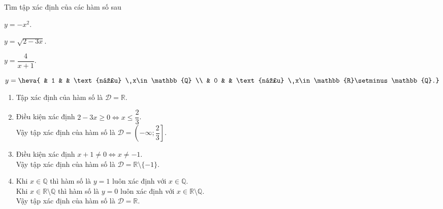\begin{bt}%
	Tìm tập xác định của các hàm số sau
	\begin{enumerate}[\indent a)]
		\begin{minipage}{0.5\linewidth}
			\item $y=-x^2$.
		\end{minipage} \begin{minipage}{0.5\linewidth}
			\item $y=\sqrt{2-3x}$.
		\end{minipage}
		\begin{minipage}{0.5\linewidth}
			\item $y=\dfrac{4}{x+1}$.
		\end{minipage} \begin{minipage}{0.5\linewidth}
			\item $y=\heva{ & 1 & & \text{nếu} \ x\in\mathbb{Q} \\ & 0 & & \text{nếu} \ x\in\mathbb{R}\setminus\mathbb{Q}.}$
		\end{minipage}
	\end{enumerate}
	\loigiai
	{
		\begin{enumerate}[\indent a)]
			\item Tập xác định của hàm số là $\mathscr{D}=\mathbb{R}$.
			\item Điều kiện xác định $2-3x\geqslant0 \Leftrightarrow x\leqslant\dfrac{2}{3}$. \\
			      Vậy tập xác định của hàm số là $\mathscr{D}=\left(-\infty;\dfrac{2}{3}\right]$.
			\item Điều kiện xác định $x+1\neq0 \Leftrightarrow x\neq-1$. \\
			      Vậy tập xác định của hàm số là $\mathscr{D}=\mathbb{R}\setminus\{-1\}$.
			\item Khi $x\in\mathbb{Q}$ thì hàm số là $y=1$ luôn xác định với $x\in\mathbb{Q}$. \\
			      Khi $x\in\mathbb{R}\setminus\mathbb{Q}$ thì hàm số là $y=0$ luôn xác định với $x\in\mathbb{R}\setminus\mathbb{Q}$. \\
			      Vậy tập xác định của hàm số là $\mathscr{D}=\mathbb{R}$.
		\end{enumerate}
	}
\end{bt}


